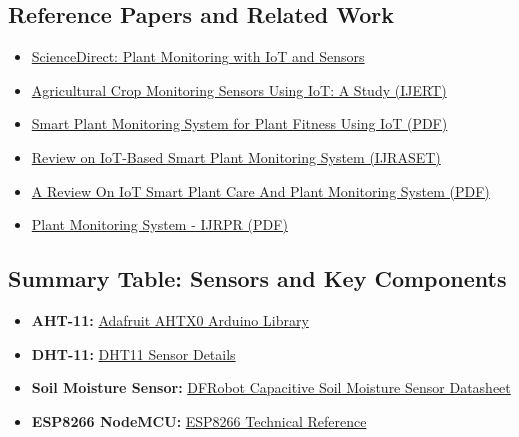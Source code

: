 \documentclass[12pt,a4paper]{article}
\begin{document}
\subsection*{Reference Papers and Related Work}
\begin{itemize}[leftmargin=*,nosep]
    \item \href{https://www.sciencedirect.com/science/article/pii/S2666154323003873}{ScienceDirect: Plant Monitoring with IoT and Sensors}
    \item \href{https://www.ijert.org/research/agricultural-crop-monitoring-sensors-using-iot-a-study-IJERTCONV6IS13115.pdf}{Agricultural Crop Monitoring Sensors Using IoT: A Study (IJERT)}
    \item \href{https://www.pnrjournal.com/index.php/home/article/download/1809/1552/2187}{Smart Plant Monitoring System for Plant Fitness Using IoT (PDF)}
    \item \href{https://www.ijraset.com/research-paper/review-on-iot-based-smart-plant-monitoring-system}{Review on IoT-Based Smart Plant Monitoring System (IJRASET)}
    \item \href{https://www.ijcrt.org/papers/IJCRT2410477.pdf}{A Review On IoT Smart Plant Care And Plant Monitoring System (PDF)}
    \item \href{https://ijrpr.com/uploads/V6ISSUE3/IJRPR39608.pdf}{Plant Monitoring System - IJRPR (PDF)}
\end{itemize}

\subsection*{Summary Table: Sensors and Key Components}
\begin{itemize}[leftmargin=*,nosep]
    \item \textbf{AHT-11:} \href{https://github.com/adafruit/Adafruit_AHTX0}{Adafruit AHTX0 Arduino Library}
    \item \textbf{DHT-11:} \href{https://components101.com/sensors/dht11-temperature-sensor}{DHT11 Sensor Details}
    \item \textbf{Soil Moisture Sensor:} \href{https://media.digikey.com/pdf/data%20sheets/dfrobot%20pdfs/sen0193_web.pdf}{DFRobot Capacitive Soil Moisture Sensor Datasheet}
    \item \textbf{ESP8266 NodeMCU:} \href{https://www.espressif.com/sites/default/files/documentation/esp8266-technical_reference_en.pdf}{ESP8266 Technical Reference}
\end{itemize}
\end{document}
